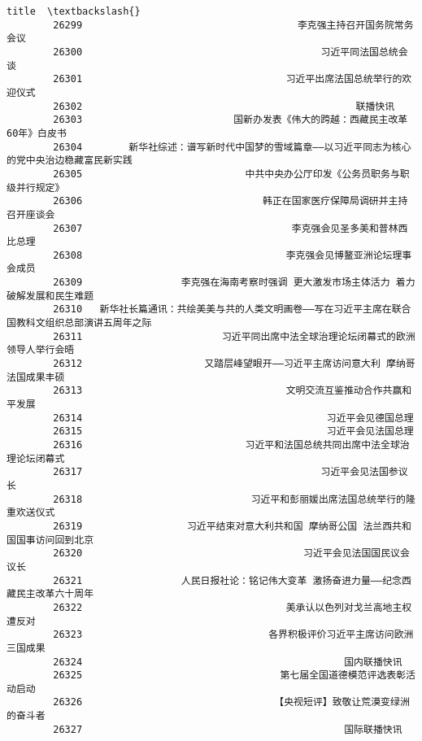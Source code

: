 \documentclass[11pt]{article}
\begin{document}
\begin{Verbatim}[commandchars=\\\{\}]
                                                           title  \textbackslash{}
        26299                                     李克强主持召开国务院常务会议   
        26300                                         习近平同法国总统会谈   
        26301                                   习近平出席法国总统举行的欢迎仪式   
        26302                                               联播快讯   
        26303                          国新办发表《伟大的跨越：西藏民主改革60年》白皮书   
        26304        新华社综述：谱写新时代中国梦的雪域篇章——以习近平同志为核心的党中央治边稳藏富民新实践   
        26305                            中共中央办公厅印发《公务员职务与职级并行规定》   
        26306                               韩正在国家医疗保障局调研并主持召开座谈会   
        26307                                    李克强会见圣多美和普林西比总理   
        26308                                   李克强会见博鳌亚洲论坛理事会成员   
        26309                 李克强在海南考察时强调 更大激发市场主体活力 着力破解发展和民生难题   
        26310   新华社长篇通讯：共绘美美与共的人类文明画卷——写在习近平主席在联合国教科文组织总部演讲五周年之际   
        26311                        习近平同出席中法全球治理论坛闭幕式的欧洲领导人举行会晤   
        26312                     又踏层峰望眼开——习近平主席访问意大利 摩纳哥 法国成果丰硕   
        26313                                   文明交流互鉴推动合作共赢和平发展   
        26314                                          习近平会见德国总理   
        26315                                          习近平会见法国总理   
        26316                            习近平和法国总统共同出席中法全球治理论坛闭幕式   
        26317                                         习近平会见法国参议长   
        26318                             习近平和彭丽媛出席法国总统举行的隆重欢送仪式   
        26319                  习近平结束对意大利共和国 摩纳哥公国 法兰西共和国国事访问回到北京   
        26320                                      习近平会见法国国民议会议长   
        26321                 人民日报社论：铭记伟大变革 激扬奋进力量——纪念西藏民主改革六十周年   
        26322                                   美承认以色列对戈兰高地主权遭反对   
        26323                                各界积极评价习近平主席访问欧洲三国成果   
        26324                                             国内联播快讯   
        26325                                  第七届全国道德模范评选表彰活动启动   
        26326                                 【央视短评】致敬让荒漠变绿洲的奋斗者   
        26327                                             国际联播快讯   

\end{Verbatim}
\end{document}
